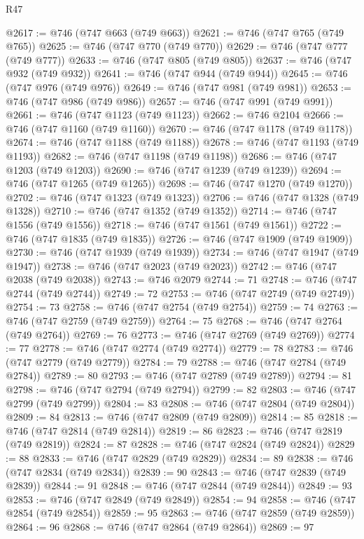 \begin{lexlean}{R47}
\begin{coremodule}
@2617 := @746 (@747 @663 (@749 @663))
@2621 := @746 (@747 @765 (@749 @765))
@2625 := @746 (@747 @770 (@749 @770))
@2629 := @746 (@747 @777 (@749 @777))
@2633 := @746 (@747 @805 (@749 @805))
@2637 := @746 (@747 @932 (@749 @932))
@2641 := @746 (@747 @944 (@749 @944))
@2645 := @746 (@747 @976 (@749 @976))
@2649 := @746 (@747 @981 (@749 @981))
@2653 := @746 (@747 @986 (@749 @986))
@2657 := @746 (@747 @991 (@749 @991))
@2661 := @746 (@747 @1123 (@749 @1123))
@2662 := @746 @2104
@2666 := @746 (@747 @1160 (@749 @1160))
@2670 := @746 (@747 @1178 (@749 @1178))
@2674 := @746 (@747 @1188 (@749 @1188))
@2678 := @746 (@747 @1193 (@749 @1193))
@2682 := @746 (@747 @1198 (@749 @1198))
@2686 := @746 (@747 @1203 (@749 @1203))
@2690 := @746 (@747 @1239 (@749 @1239))
@2694 := @746 (@747 @1265 (@749 @1265))
@2698 := @746 (@747 @1270 (@749 @1270))
@2702 := @746 (@747 @1323 (@749 @1323))
@2706 := @746 (@747 @1328 (@749 @1328))
@2710 := @746 (@747 @1352 (@749 @1352))
@2714 := @746 (@747 @1556 (@749 @1556))
@2718 := @746 (@747 @1561 (@749 @1561))
@2722 := @746 (@747 @1835 (@749 @1835))
@2726 := @746 (@747 @1909 (@749 @1909))
@2730 := @746 (@747 @1939 (@749 @1939))
@2734 := @746 (@747 @1947 (@749 @1947))
@2738 := @746 (@747 @2023 (@749 @2023))
@2742 := @746 (@747 @2038 (@749 @2038))
@2743 := @746 @2079
@2744 := 71
@2748 := @746 (@747 @2744 (@749 @2744))
@2749 := 72
@2753 := @746 (@747 @2749 (@749 @2749))
@2754 := 73
@2758 := @746 (@747 @2754 (@749 @2754))
@2759 := 74
@2763 := @746 (@747 @2759 (@749 @2759))
@2764 := 75
@2768 := @746 (@747 @2764 (@749 @2764))
@2769 := 76
@2773 := @746 (@747 @2769 (@749 @2769))
@2774 := 77
@2778 := @746 (@747 @2774 (@749 @2774))
@2779 := 78
@2783 := @746 (@747 @2779 (@749 @2779))
@2784 := 79
@2788 := @746 (@747 @2784 (@749 @2784))
@2789 := 80
@2793 := @746 (@747 @2789 (@749 @2789))
@2794 := 81
@2798 := @746 (@747 @2794 (@749 @2794))
@2799 := 82
@2803 := @746 (@747 @2799 (@749 @2799))
@2804 := 83
@2808 := @746 (@747 @2804 (@749 @2804))
@2809 := 84
@2813 := @746 (@747 @2809 (@749 @2809))
@2814 := 85
@2818 := @746 (@747 @2814 (@749 @2814))
@2819 := 86
@2823 := @746 (@747 @2819 (@749 @2819))
@2824 := 87
@2828 := @746 (@747 @2824 (@749 @2824))
@2829 := 88
@2833 := @746 (@747 @2829 (@749 @2829))
@2834 := 89
@2838 := @746 (@747 @2834 (@749 @2834))
@2839 := 90
@2843 := @746 (@747 @2839 (@749 @2839))
@2844 := 91
@2848 := @746 (@747 @2844 (@749 @2844))
@2849 := 93
@2853 := @746 (@747 @2849 (@749 @2849))
@2854 := 94
@2858 := @746 (@747 @2854 (@749 @2854))
@2859 := 95
@2863 := @746 (@747 @2859 (@749 @2859))
@2864 := 96
@2868 := @746 (@747 @2864 (@749 @2864))
@2869 := 97

\end{coremodule}
\end{lexlean}
